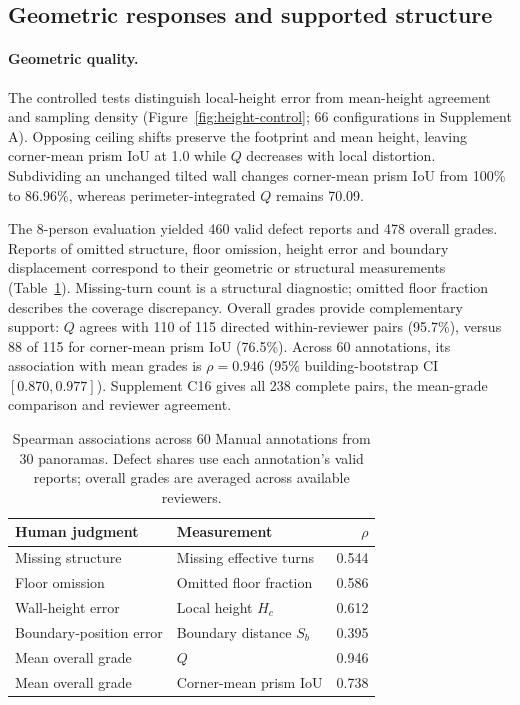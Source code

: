 \subsection{Geometric responses and supported structure}
\label{sec:q-validation}\label{sec:human-validation}

\paragraph{Geometric quality.}
The controlled tests distinguish local-height error from mean-height agreement and sampling density (Figure~\ref{fig:height-control}; 66 configurations in Supplement A). Opposing ceiling shifts preserve the footprint and mean height, leaving corner-mean prism IoU at 1.0 while $Q$ decreases with local distortion. Subdividing an unchanged tilted wall changes corner-mean prism IoU from 100\% to 86.96\%, whereas perimeter-integrated $Q$ remains 70.09.



The 8-person evaluation yielded 460 valid defect reports and 478 overall grades. Reports of omitted structure, floor omission, height error and boundary displacement correspond to their geometric or structural measurements (Table~\ref{tab:quality-feedback}). Missing-turn count is a structural diagnostic; omitted floor fraction describes the coverage discrepancy. Overall grades provide complementary support: $Q$ agrees with 110 of 115 directed within-reviewer pairs (95.7\%), versus 88 of 115 for corner-mean prism IoU (76.5\%). Across 60 annotations, its association with mean grades is $\rho=0.946$ (95\% building-bootstrap CI $[0.870,0.977]$). Supplement C16 gives all 238 complete pairs, the mean-grade comparison and reviewer agreement.

\begin{table}[t]
\centering\small
\caption{Spearman associations across 60 Manual annotations from 30 panoramas. Defect shares use each annotation's valid reports; overall grades are averaged across available reviewers.}
\label{tab:quality-feedback}
\setlength{\tabcolsep}{3pt}\renewcommand{\arraystretch}{1.08}
\begin{tabular}{@{}>{\raggedright\arraybackslash}p{.38\linewidth}>{\raggedright\arraybackslash}p{.43\linewidth}r@{}}
\toprule
Human judgment & Measurement & $\rho$\\
\midrule
Missing structure & Missing effective turns & 0.544\\
Floor omission & Omitted floor fraction & 0.586\\
Wall-height error & Local height $H_c$ & 0.612\\
Boundary-position error & Boundary distance $S_b$ & 0.395\\
\midrule
Mean overall grade & $Q$ & 0.946\\
Mean overall grade & Corner-mean prism IoU & 0.738\\
\bottomrule
\end{tabular}
\end{table}

